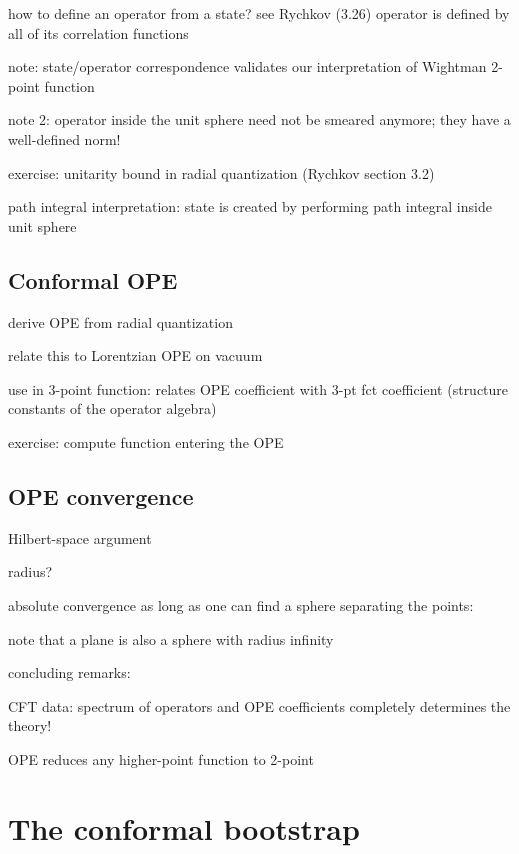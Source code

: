 \documentclass[a4paper,12pt]{article}
\numberwithin{equation}{section}
\begin{document}
how to define an operator from a state? see Rychkov (3.26)
operator is defined by all of its correlation functions



note: state/operator correspondence validates our interpretation of Wightman 2-point function

note 2: operator inside the unit sphere need not be smeared anymore; they have a well-defined norm!



exercise: unitarity bound in radial quantization (Rychkov section 3.2)



path integral interpretation: state is created by performing path integral inside unit sphere



\subsection{Conformal OPE}

derive OPE from radial quantization

relate this to Lorentzian OPE on vacuum


use in 3-point function: relates OPE coefficient with 3-pt fct coefficient
(structure constants of the operator algebra)

exercise: compute function entering the OPE


\subsection{OPE convergence}

Hilbert-space argument


radius? 

absolute convergence as long as one can find a sphere separating the points:

note that a plane is also a sphere with radius infinity




concluding remarks:


CFT data: spectrum of operators and OPE coefficients
completely determines the theory!

OPE reduces any higher-point function to 2-point



\section{The conformal bootstrap}
\end{document}
